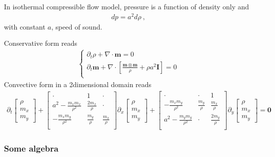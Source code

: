 \documentclass[letterpaper,10pt,english]{jupyterBook}
\begin{document}
\sphinxAtStartPar
In isothermal compressible flow model, pressure is a function of density only and
\begin{equation*}
\begin{split}d p = a^2 d \rho \ ,\end{split}
\end{equation*}
\sphinxAtStartPar
with constant \(a\), speed of sound.

\sphinxAtStartPar
Conservative form reads
\begin{equation*}
\begin{split}\begin{cases}
  \partial_t \rho + \nabla \cdot \mathbf{m} = 0 \\
  \partial_t \mathbf{m} + \nabla \cdot \left[ \frac{\mathbf{m}\otimes\mathbf{m}}{\rho} + \rho a^2 \mathbf{I} \right] = 0 \\
\end{cases}\end{split}
\end{equation*}
\sphinxAtStartPar
Convective form in a 2\sphinxhyphen{}dimensional domain reads
\begin{equation*}
\begin{split}
\partial_t \begin{bmatrix} \rho \\ m_x \\ m_y \end{bmatrix} +
\begin{bmatrix}
  \cdot & 1     & \cdot \\
  a^2 - \frac{m_x m_x}{\rho^2} & \frac{2 m_x}{\rho} & \cdot \\
      - \frac{m_x m_y}{\rho^2} & \frac{m_y}{\rho} & \frac{m_x}{\rho} \\
\end{bmatrix} \partial_x \begin{bmatrix} \rho \\ m_x \\ m_y \end{bmatrix} +
\begin{bmatrix}
  \cdot & \cdot & 1     \\
  - \frac{m_x m_y}{\rho^2} & \frac{m_y}{\rho} & \frac{m_x}{\rho} \\
  a^2 - \frac{m_y m_y}{\rho^2} & \cdot & \frac{2 m_y}{\rho} \\
\end{bmatrix} \partial_y \begin{bmatrix} \rho \\ m_x \\ m_y \end{bmatrix} = \mathbf{0}
\end{split}
\end{equation*}\subsubsection*{Some algebra}
\end{document}
